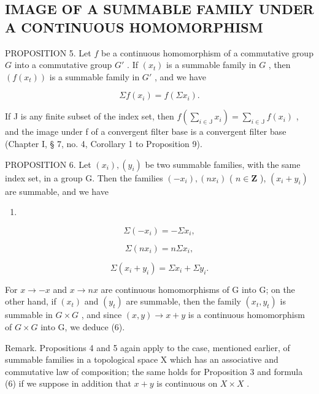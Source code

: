 \subsection{IMAGE OF A SUMMABLE FAMILY UNDER A CONTINUOUS HOMOMORPHISM}

PROPOSITION 5. Let \(f\) be a continuous homomorphism of a commutative group \(G\) into a commutative group \(G'\) . If \((x_t)\) is a summable family in \(G\) , then \((f(x_t))\) is a summable family in \(G'\) , and we have

\[
\Sigma f (x _ {i}) = f (\Sigma x _ {i}).\tag{3}
\]

If J is any finite subset of the index set, then \(f\left(\sum_{i \in \mathbb{J}} x_i\right) = \sum_{i \in \mathbb{J}} f(x_i)\) , and the image under f of a convergent filter base is a convergent filter base (Chapter I, § 7, no. 4, Corollary 1 to Proposition 9).

PROPOSITION 6. Let \((x_{i}), (y_{i})\) be two summable families, with the same index set, in a group G. Then the families \((-x_{i}), (nx_{i})\) ( \(n \in \mathbf{Z}\) ), \((x_{i} + y_{i})\) are summable, and we have

\begin{enumerate}
\def\labelenumi{(\arabic{enumi})}
\setcounter{enumi}{3}
\tightlist
\item
\end{enumerate}

\[
\Sigma (- x _ {i}) = - \Sigma x _ {i},\tag{5}
\]

\[
\Sigma (n x _ {i}) = n \Sigma x _ {i},\tag{6}
\]

\[
\Sigma (x _ {i} + y _ {i}) = \Sigma x _ {i} + \Sigma y _ {i}.
\]

For \(x \rightarrow -x\) and \(x \rightarrow nx\) are continuous homomorphisms of G into G; on the other hand, if \((x_{t})\) and \((y_{t})\) are summable, then the family \((x_{t}, y_{t})\) is summable in \(G \times G\) , and since \((x, y) \rightarrow x + y\) is a continuous homomorphism of \(G \times G\) into G, we deduce (6).

Remark. Propositions 4 and 5 again apply to the case, mentioned earlier, of summable families in a topological space X which has an associative and commutative law of composition; the same holds for Proposition 3 and formula (6) if we suppose in addition that \(x + y\) is continuous on \(X \times X\) .

